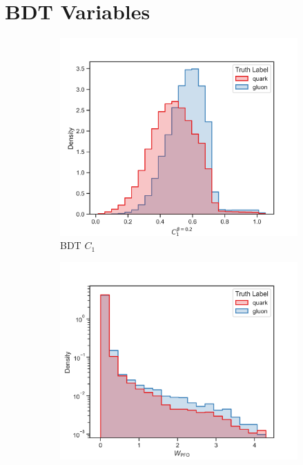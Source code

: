 \FloatBarrier

\section{BDT Variables}
\label{sec:app_bdt_variables}
\begin{figure}[!htb]
    \centering
    \begin{subfigure}[t]{0.49\textwidth}
        \includegraphics[width=\linewidth]{src/plots/distributions/BDT/C1_PFO_jet.png}
        \caption{BDT $C_1$}
        \label{fig:app_bdt_C1}
    \end{subfigure}
    \begin{subfigure}[t]{0.49\textwidth}
        \includegraphics[width=\linewidth]{src/plots/distributions/BDT/W_PFO_jet.png}

\end{subfigure}
\end{figure}
